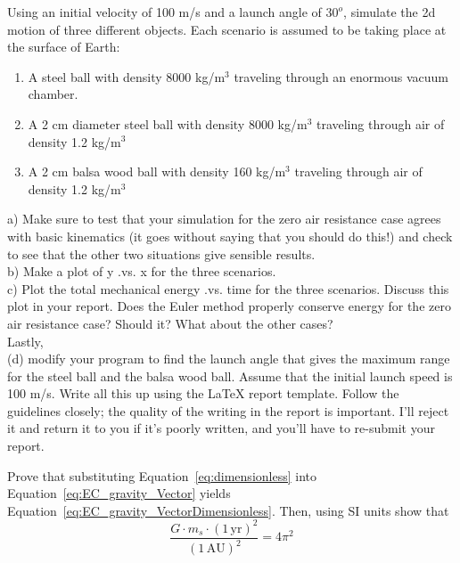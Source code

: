 \begin{prob}
\label{2d}
Using an initial velocity of 100 m/s and a launch angle of $30^o$, simulate the 2d motion of three different objects. Each scenario is assumed to be taking place at the surface of Earth:
\begin{enumerate}
	\item A steel ball with density 8000 kg/m$^3$ traveling through an enormous vacuum chamber.
	\item A 2 cm diameter steel ball with density 8000 kg/m$^3$ traveling through air of density 1.2 kg/m$^3$
	\item A  2 cm balsa wood ball with density 160 kg/m$^3$ traveling through air of density 1.2 kg/m$^3$
\end{enumerate}
a) Make sure to test that your simulation for the zero air resistance case agrees with basic kinematics (it goes without saying that you should do this!) and check to see that the other two situations give sensible results. \\
b) Make a plot of y .vs. x for the three scenarios.\\
c) Plot the total mechanical energy .vs. time for the three scenarios. Discuss this plot in your report. Does the Euler method properly conserve energy for the zero air resistance case? Should it? What about the other cases?\\
Lastly, \\
(d) modify your program to find the launch angle that gives the maximum range for the steel ball and the balsa wood ball. Assume that the initial launch speed is 100 m/s. 
Write all this up using the LaTeX report template. Follow the guidelines closely; the quality of the writing in the report is important. I'll reject it and return it to you if it's poorly written, and you'll have to re-submit your report.\\
\end{prob}

\begin{prob} \label{dimensionless}
Prove that substituting Equation~\ref{eq:dimensionless} into Equation~\ref{eq:EC_gravity_Vector} yields Equation~\ref{eq:EC_gravity_VectorDimensionless}. Then, using SI units show that
$$ \frac{G\cdot m_s \cdot (1\,\mathrm{yr})^2}{(1\,\mathrm{AU})^2}  = 4\pi^2$$

\end{prob}

